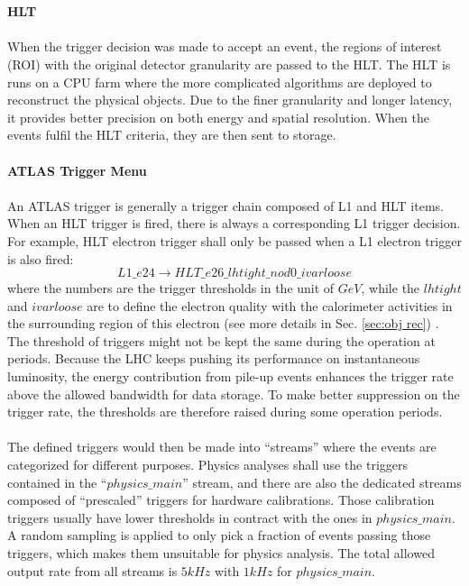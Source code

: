 \\
\\{\bf HLT}
\\
\\When the trigger decision was made to accept an event, the regions of interest (ROI) with the original detector granularity are passed to the HLT. The HLT is runs on a CPU farm where the more complicated algorithms are deployed to reconstruct the physical objects. Due to the finer granularity and longer latency, it provides better precision on both energy and spatial resolution. When the events fulfil the HLT criteria, they are then sent to storage. 
\\
\\{\bf ATLAS Trigger Menu}
\\
\\An ATLAS trigger is generally a trigger chain composed of L1 and HLT items. When an HLT trigger is fired, there is always a corresponding L1 trigger decision. For example, HLT electron trigger shall only be passed when a L1 electron trigger is also fired:
\begin{equation}
L1\_e24 \rightarrow HLT\_e26\_lhtight\_nod0\_ivarloose
\end{equation}
where the numbers are the trigger thresholds in the unit of $GeV$, while the $lhtight$ and $ivarloose$ are to define the electron quality with the calorimeter activities in the surrounding region of this electron (see more details in Sec. \ref{sec:obj rec}) . The threshold of triggers might not be kept the same during the operation at periods. Because the LHC keeps pushing its performance on instantaneous luminosity, the energy contribution from pile-up events enhances the trigger rate above the allowed bandwidth for data storage. To make better suppression on the trigger rate, the thresholds are therefore raised during some operation periods. 
\\
\\The defined triggers would then be made into ``streams'' where the events are categorized for different purposes. Physics analyses shall use the triggers contained in the ``$physics\_main$'' stream, and there are also the dedicated streams composed of ``prescaled'' triggers for hardware calibrations. Those calibration triggers usually have lower thresholds in contract with the ones in $physics\_main$. A random sampling is applied to only pick a fraction of events passing those triggers, which makes them unsuitable for physics analysis. The total allowed output rate from all streams is $5kHz$ with $1kHz$ for $physics\_main$. 

